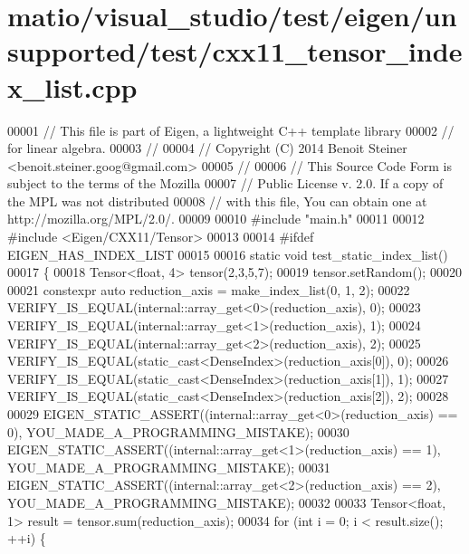 \hypertarget{matio_2visual__studio_2test_2eigen_2unsupported_2test_2cxx11__tensor__index__list_8cpp_source}{}\section{matio/visual\+\_\+studio/test/eigen/unsupported/test/cxx11\+\_\+tensor\+\_\+index\+\_\+list.cpp}
\label{matio_2visual__studio_2test_2eigen_2unsupported_2test_2cxx11__tensor__index__list_8cpp_source}

\begin{DoxyCode}
00001 \textcolor{comment}{// This file is part of Eigen, a lightweight C++ template library}
00002 \textcolor{comment}{// for linear algebra.}
00003 \textcolor{comment}{//}
00004 \textcolor{comment}{// Copyright (C) 2014 Benoit Steiner <benoit.steiner.goog@gmail.com>}
00005 \textcolor{comment}{//}
00006 \textcolor{comment}{// This Source Code Form is subject to the terms of the Mozilla}
00007 \textcolor{comment}{// Public License v. 2.0. If a copy of the MPL was not distributed}
00008 \textcolor{comment}{// with this file, You can obtain one at http://mozilla.org/MPL/2.0/.}
00009 
00010 \textcolor{preprocessor}{#include "main.h"}
00011 
00012 \textcolor{preprocessor}{#include <Eigen/CXX11/Tensor>}
00013 
00014 \textcolor{preprocessor}{#ifdef EIGEN\_HAS\_INDEX\_LIST}
00015 
00016 \textcolor{keyword}{static} \textcolor{keywordtype}{void} test\_static\_index\_list()
00017 \{
00018   Tensor<float, 4> tensor(2,3,5,7);
00019   tensor.setRandom();
00020 
00021   constexpr \textcolor{keyword}{auto} reduction\_axis = make\_index\_list(0, 1, 2);
00022   VERIFY\_IS\_EQUAL(internal::array\_get<0>(reduction\_axis), 0);
00023   VERIFY\_IS\_EQUAL(internal::array\_get<1>(reduction\_axis), 1);
00024   VERIFY\_IS\_EQUAL(internal::array\_get<2>(reduction\_axis), 2);
00025   VERIFY\_IS\_EQUAL(static\_cast<DenseIndex>(reduction\_axis[0]), 0);
00026   VERIFY\_IS\_EQUAL(static\_cast<DenseIndex>(reduction\_axis[1]), 1);
00027   VERIFY\_IS\_EQUAL(static\_cast<DenseIndex>(reduction\_axis[2]), 2);
00028 
00029   EIGEN\_STATIC\_ASSERT((internal::array\_get<0>(reduction\_axis) == 0), YOU\_MADE\_A\_PROGRAMMING\_MISTAKE);
00030   EIGEN\_STATIC\_ASSERT((internal::array\_get<1>(reduction\_axis) == 1), YOU\_MADE\_A\_PROGRAMMING\_MISTAKE);
00031   EIGEN\_STATIC\_ASSERT((internal::array\_get<2>(reduction\_axis) == 2), YOU\_MADE\_A\_PROGRAMMING\_MISTAKE);
00032 
00033   Tensor<float, 1> result = tensor.sum(reduction\_axis);
00034   \textcolor{keywordflow}{for} (\textcolor{keywordtype}{int} i = 0; i < result.size(); ++i) \{

\end{DoxyCode}
